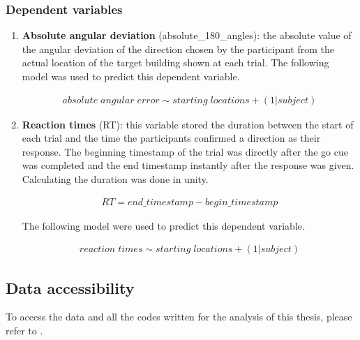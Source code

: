 \subsubsection{Dependent variables}

\begin{enumerate}
	\item \textbf{Absolute angular deviation} {\emphasize (absolute\_180\_angles)}: the absolute value of the angular deviation of the direction chosen by the participant from the actual location of the target building shown at each trial. The following model was used to predict this dependent variable. 
	
	\begin{align*}
		absolute \; angular \; error \sim starting \; locations + (1 | subject)
	\end{align*}
	

	\item \textbf{Reaction times} {\emphasize (RT)}: this variable stored the duration between the start of each trial and the time the participants confirmed a direction as their response. The beginning timestamp of the trial was directly after the go cue was completed and the end timestamp instantly after the response was given. Calculating the duration was done in unity. 
	
	\begin{align*}
		RT = end\_timestamp - begin\_timestamp
	\end{align*}

	 The following model were used to predict this dependent variable.
	 
	 \begin{align*}
	 	reaction \; times \sim starting \; locations + (1 | subject)
	 \end{align*}
 
\end{enumerate}


\subsection{Data accessibility}

To access the data and all the codes written for the analysis of this thesis, please refer to \textcite{Maleki_The_effect_of_2022}.


